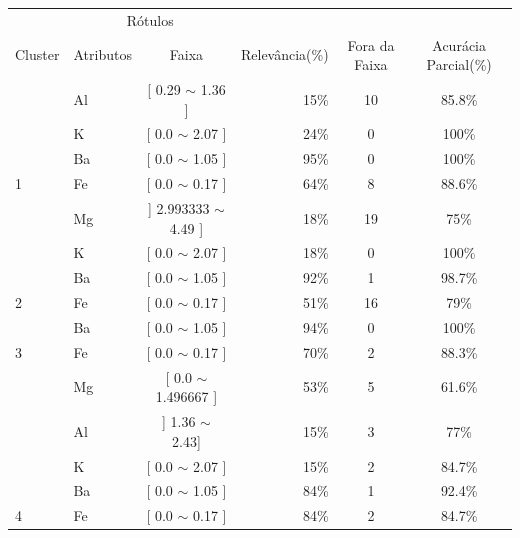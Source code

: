 \begin{table}[!h]
{\begin{tabular}{llcrcc}
\multicolumn{1}{c}{\cellcolor[HTML]{FFFFFF}} & \multicolumn{2}{c}{Rótulos}                & \multicolumn{1}{r}{}               & \\ \cline{2-3}
Cluster                                      & Atributos      & \multicolumn{1}{c}{Faixa} & \multicolumn{1}{c}{Relevância(\%)} & Fora da Faixa & Acurácia Parcial(\%)\\ \hline \hline
                                             & Al   & [ 0.29 $\sim$  1.36 ]     & 15\%  & 10  & 85.8\% \\  
                                            & K     & [ 0.0 $\sim$  2.07 ]     & 24\%  & 0  & 100\% \\  
                                             & Ba    & [ 0.0 $\sim$  1.05 ]   & 95\%  & 0 & 100\% \\  
\multirow{-4}{*}{1}                          & Fe    & [ 0.0 $\sim$  0.17  ]   & 64\%  & 8 & 88.6\% \\  \hline
                                             & Mg    & ] 2.993333 $\sim$  4.49 ]   & 18\%  & 19 & 75\%\\ 
                                             & K     & [ 0.0 $\sim$  2.07 ]     & 18\%  & 0  & 100\% \\
                                            & Ba     & [ 0.0 $\sim$ 1.05 ]    & 92\%  & 1  & 98.7\% \\  
\multirow{-4}{*}{2}                          & Fe    & [ 0.0 $\sim$  0.17 ]    & 51\%  & 16 & 79\% \\  \hline
                                            & Ba     & [ 0.0 $\sim$  1.05 ]    & 94\%  & 0  & 100\% \\  
\multirow{-2}{*}{3}                          & Fe    & [ 0.0 $\sim$   0.17 ]    & 70\%  & 2  & 88.3\% \\  \hline
                                             & Mg    & [ 0.0 $\sim$  1.496667 ]    & 53\%  & 5  & 61.6\%\\ 
                                             & Al    & ] 1.36 $\sim$  2.43]      & 15\%  & 3  & 77\%\\
                                            & K     & [  0.0 $\sim$  2.07 ]    & 15\%  & 2  & 84.7\% \\ 
                                            & Ba     & [ 0.0 $\sim$  1.05 ]    & 84\%  & 1  & 92.4\% \\  
\multirow{-5}{*}{4}                          & Fe    & [ 0.0 $\sim$  0.17 ]    & 84\%  & 2  & 84.7\% \\  \hline                                            

\end{tabular}}
\end{table}
